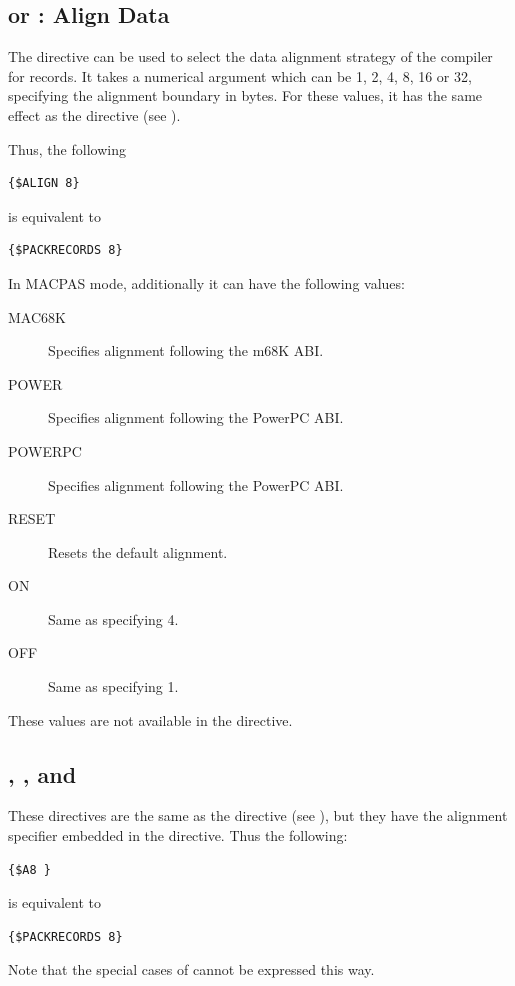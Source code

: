 \subsection{ or  : Align Data}
\label{se:Align}

The  directive can be used to select the data alignment 
strategy of the compiler for records. It takes a numerical argument
which can be 1, 2, 4, 8, 16 or 32, specifying the alignment boundary 
in bytes. For these values, it has the same effect as the 
 directive (see ).

Thus, the following
\begin{verbatim}
{$ALIGN 8}
\end{verbatim}
is equivalent to 
\begin{verbatim}
{$PACKRECORDS 8}
\end{verbatim}

In MACPAS mode, additionally it can have the following values:
\begin{description}
\item[MAC68K] Specifies alignment following the m68K ABI.
\item[POWER] Specifies alignment following the PowerPC ABI.
\item[POWERPC] Specifies alignment following the PowerPC ABI.
\item[RESET] Resets the default alignment.
\item[ON] Same as specifying 4.
\item[OFF] Same as specifying 1.
\end{description}
These values are not available in the  directive. 

\subsection{, , and }
\label{se:An}

These directives are the same as the  directive 
(see ), but they have the alignment specifier embedded in the
directive. Thus the following:
\begin{verbatim}
{$A8 }
\end{verbatim}
is equivalent to 
\begin{verbatim}
{$PACKRECORDS 8}
\end{verbatim}
Note that the special cases of  cannot be expressed this
way.

